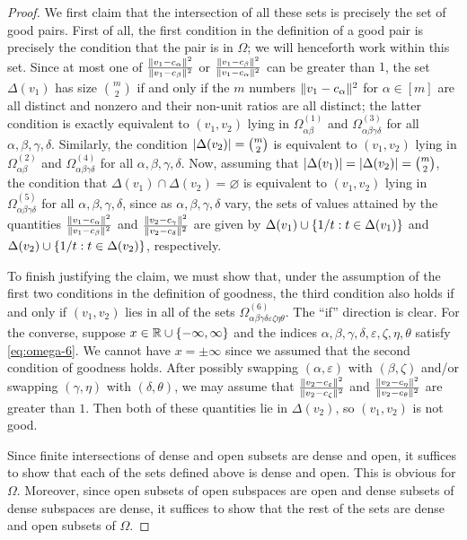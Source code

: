 \documentclass[11pt]{amsart}
\theoremstyle{definition}
\DeclarePairedDelimiter{\set}{\{}{\}}
\DeclarePairedDelimiter{\abs}{\lvert}{\rvert}
\DeclarePairedDelimiter{\Abs}{\lVert}{\rVert}
\newcommand{\eps}{\varepsilon}
\newcommand{\RR}{\mathbb{R}}
\begin{document}
\begin{proof}
We first claim that the intersection of all these sets is precisely the set of good pairs. First of all, the first condition in the definition of a good pair is precisely the condition that the pair is in $\Omega$; we will henceforth work within this set. Since at most one of $\frac{\Abs{v_1 - c_\alpha}^2}{\Abs{v_1 - c_\beta}^2}$ or $\frac{\Abs{v_1 - c_\beta}^2}{\Abs{v_1 - c_\alpha}^2}$ can be greater than $1$, the set $\Delta(v_1)$ has size $\binom{m}{2}$ if and only if the $m$ numbers $\Abs{v_1 - c_\alpha}^2$ for $\alpha \in [m]$ are all distinct and nonzero and their non-unit ratios are all distinct; the latter condition is exactly equivalent to $(v_1,v_2)$ lying in $\Omega^{(1)}_{\alpha\beta}$ and $\Omega^{(3)}_{\alpha\beta\gamma\delta}$ for all $\alpha,\beta,\gamma,\delta$. Similarly, the condition $\abs{\Delta(v_2)} = \binom{m}{2}$ is equivalent to $(v_1,v_2)$ lying in $\Omega^{(2)}_{\alpha\beta}$ and $\Omega^{(4)}_{\alpha\beta\gamma\delta}$ for all $\alpha,\beta,\gamma,\delta$. Now, assuming that $\abs{\Delta(v_1)} = \abs{\Delta(v_2)} = \binom{m}{2}$, the condition that $\Delta(v_1) \cap \Delta(v_2) = \varnothing$ is equivalent to $(v_1,v_2)$ lying in $\Omega^{(5)}_{\alpha\beta\gamma\delta}$ for all $\alpha,\beta,\gamma,\delta$, since as $\alpha,\beta,\gamma,\delta$ vary, the sets of values attained by the quantities $\frac{\Abs{v_1 - c_\alpha}^2}{\Abs{v_1 - c_\beta}^2}$ and $\frac{\Abs{v_2 - c_\gamma}^2}{\Abs{v_2 - c_\delta}^2}$ are given by $\Delta(v_1) \cup \set{1/t : t \in \Delta(v_1)}$ and $\Delta(v_2) \cup \set{1/t : t \in \Delta(v_2)}$, respectively.

To finish justifying the claim, we must show that, under the assumption of the first two conditions in the definition of goodness, the third condition also holds if and only if $(v_1,v_2)$ lies in all of the sets $\Omega^{(6)}_{\alpha\beta\gamma\delta\eps\zeta\eta\theta}$. The ``if'' direction is clear. For the converse, suppose $x \in \RR \cup \set{-\infty, \infty}$ and the indices $\alpha,\beta,\gamma,\delta,\eps,\zeta,\eta,\theta$ satisfy \eqref{eq:omega-6}.
We cannot have $x=\pm\infty$ since we assumed that the second condition of goodness holds. After possibly swapping $(\alpha,\eps)$ with $(\beta,\zeta)$ and/or swapping $(\gamma,\eta)$ with $(\delta,\theta)$, we may assume that $\frac{\Abs{v_2 - c_\eps}^2}{\Abs{v_2 - c_\zeta}^2}$ and $\frac{\Abs{v_2 - c_\eta}^2}{\Abs{v_2 - c_\theta}^2}$ are greater than $1$.  Then both of these quantities lie in $\Delta(v_2)$, so $(v_1,v_2)$ is not good.

Since finite intersections of dense and open subsets are dense and open, it suffices to show that each of the sets defined above is dense and open. This is obvious for $\Omega$. Moreover, since open subsets of open subspaces are open and dense subsets of dense subspaces are dense, it suffices to show that the rest of the sets are dense and open subsets of $\Omega$.


\end{proof}
\end{document}
